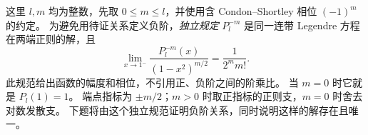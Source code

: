 这里 $l,m$ 均为整数，先取 $0\le m\le l$，并使用含 Condon--Shortley 相位 $(-1)^m$ 的约定。
为避免用待证关系定义负阶，\emph{独立规定} $P_l^{-m}$ 是同一连带 Legendre 方程在两端正则的解，且
\begin{equation}
 \lim_{x\to1^-}\frac{P_l^{-m}(x)}{(1-x^2)^{m/2}}=\frac1{2^m m!}.\tag{A3.N}
 \label{advA3:eq:complete-negative-norm}
\end{equation}
此规范给出函数的幅度和相位，不引用正、负阶之间的阶乘比。
当 $m=0$ 时它就是 $P_l(1)=1$。
端点指标为 $\pm m/2$；$m>0$ 时取正指标的正则支，$m=0$ 时舍去对数发散支。
下题将由这个独立规范证明负阶关系，同时说明这样的解存在且唯一。
